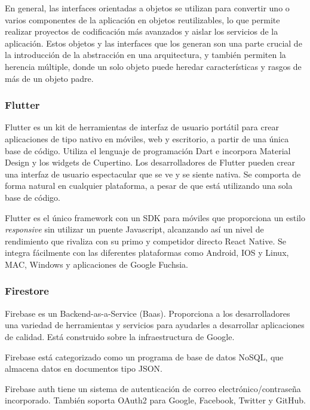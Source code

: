 \documentclass{article}
\begin{document}
En general, las interfaces orientadas a objetos se utilizan para convertir uno o varios 
componentes de la aplicación en objetos reutilizables, lo que permite realizar proyectos 
de codificación más avanzados y aislar los servicios de la aplicación. Estos objetos y 
las interfaces que los generan son una parte crucial de la introducción de la abstracción 
en una arquitectura, y también permiten la herencia múltiple, donde un solo objeto puede 
heredar características y rasgos de más de un objeto padre.

\subsubsection{Flutter}
Flutter es un kit de herramientas de interfaz de usuario portátil para crear 
aplicaciones de tipo nativo en móviles, web y escritorio, a partir de una 
única base de código. Utiliza el lenguaje de programación Dart e incorpora 
Material Design y los widgets de Cupertino. Los desarrolladores de Flutter 
pueden crear una interfaz de usuario espectacular que se ve y se siente 
nativa. Se comporta de forma natural en cualquier plataforma, a pesar de 
que está utilizando una sola base de código.

Flutter es el único framework con un SDK para móviles que proporciona un 
estilo \emph{responsive} sin utilizar un puente Javascript, alcanzando así un 
nivel de rendimiento que rivaliza con su primo y competidor directo 
React Native. Se integra fácilmente con las diferentes plataformas como 
Android, IOS y Linux, MAC, Windows y aplicaciones de Google Fuchsia.


\subsubsection{Firestore}
Firebase es un Backend-as-a-Service (Baas). Proporciona a los desarrolladores 
una variedad de herramientas y servicios para ayudarles a desarrollar aplicaciones 
de calidad. Está construido sobre la infraestructura de Google.

Firebase está categorizado como un programa de base de datos NoSQL, que almacena 
datos en documentos tipo JSON.

Firebase auth tiene un sistema de autenticación de correo electrónico/contraseña 
incorporado. También soporta OAuth2 para Google, Facebook, Twitter y GitHub. 


\end{document}

